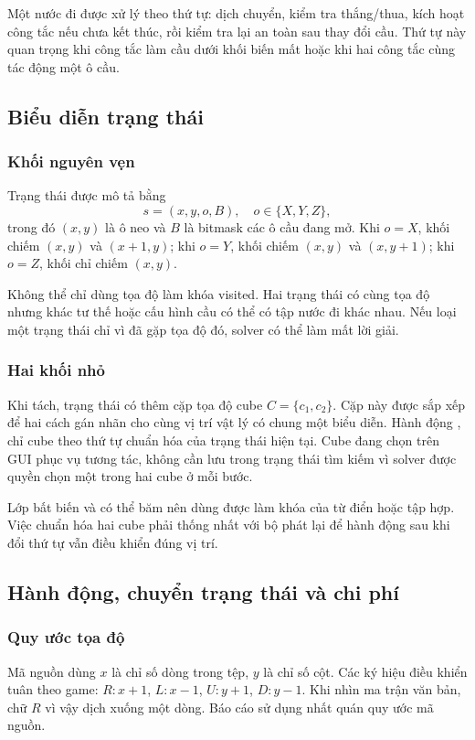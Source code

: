 \documentclass[a4paper]{article}
\newcommand{\tep}[1]{{\small\ttfamily\detokenize{#1}}}
\begin{document}
Một nước đi được xử lý theo thứ tự: dịch chuyển, kiểm tra thắng/thua, kích hoạt công tắc nếu chưa kết thúc, rồi kiểm tra lại an toàn sau thay đổi cầu. Thứ tự này quan trọng khi công tắc làm cầu dưới khối biến mất hoặc khi hai công tắc cùng tác động một ô cầu. 
\subsection{Biểu diễn trạng thái}
\subsubsection{Khối nguyên vẹn}
Trạng thái được mô tả bằng
\begin{equation}
s=(x,y,o,B),\quad o\in\{X,Y,Z\},
\end{equation}
trong đó $(x,y)$ là ô neo và $B$ là bitmask các ô cầu đang mở. Khi $o=X$, khối chiếm $(x,y)$ và $(x+1,y)$; khi $o=Y$, khối chiếm $(x,y)$ và $(x,y+1)$; khi $o=Z$, khối chỉ chiếm $(x,y)$.

Không thể chỉ dùng tọa độ làm khóa visited. Hai trạng thái có cùng tọa độ nhưng khác tư thế hoặc cấu hình cầu có thể có tập nước đi khác nhau. Nếu loại một trạng thái chỉ vì đã gặp tọa độ đó, solver có thể làm mất lời giải.

\subsubsection{Hai khối nhỏ}
Khi tách, trạng thái có thêm cặp tọa độ cube $C=\{c_1,c_2\}$. Cặp này được sắp xếp để hai cách gán nhãn cho cùng vị trí vật lý có chung một biểu diễn. Hành động \tep{0U}, \tep{1R} chỉ cube theo thứ tự chuẩn hóa của trạng thái hiện tại. Cube đang chọn trên GUI phục vụ tương tác, không cần lưu trong trạng thái tìm kiếm vì solver được quyền chọn một trong hai cube ở mỗi bước.

Lớp \tep{State} bất biến và có thể băm nên dùng được làm khóa của từ điển hoặc tập hợp. Việc chuẩn hóa hai cube phải thống nhất với bộ phát lại để hành động sau khi đổi thứ tự vẫn điều khiển đúng vị trí.



\subsection{Hành động, chuyển trạng thái và chi phí}
\subsubsection{Quy ước tọa độ}
Mã nguồn dùng $x$ là chỉ số dòng trong tệp, $y$ là chỉ số cột. Các ký hiệu điều khiển tuân theo game: $R:x+1$, $L:x-1$, $U:y+1$, $D:y-1$. Khi nhìn ma trận văn bản, chữ $R$ vì vậy dịch xuống một dòng. Báo cáo sử dụng nhất quán quy ước mã nguồn.
\end{document}
